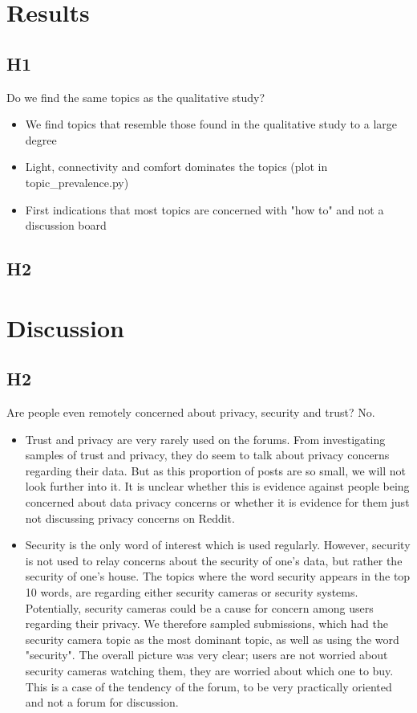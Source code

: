 \documentclass{article}
\begin{document}
    \section{Results}
    \subsection{H1}
    Do we find the same topics as the qualitative study?
    \begin{itemize}
        \item We find topics that resemble those found in the qualitative study to a large degree
        \item Light, connectivity and comfort dominates the topics (plot in topic\_prevalence.py)
        \item First indications that most topics are concerned with "how to" and not a discussion board
    \end{itemize}
    \subsection{H2}
    
    \section{Discussion}
    \subsection{H2}
    Are people even remotely concerned about privacy, security and trust?
    No.
    \begin{itemize}
        \item Trust and privacy are very rarely used on the forums. From investigating samples of trust and privacy, they do seem to talk about privacy concerns regarding their data. But as this proportion of posts are so small, we will not look further into it. It is unclear whether this is evidence against people being concerned about data privacy concerns or whether it is evidence for them just not discussing privacy concerns on Reddit.
        \item Security is the only word of interest which is used regularly. However, security is not used to relay concerns about the security of one's data, but rather the security of one's house. The topics where the word security appears in the top 10 words, are regarding either security cameras or security systems. Potentially, security cameras could be a cause for concern among users regarding their privacy. We therefore sampled submissions, which had the security camera topic as the most dominant topic, as well as using the word "security". The overall picture was very clear; users are not worried about security cameras watching them, they are worried about which one to buy. This is a case of the tendency of the forum, to be very practically oriented and not a forum for discussion.
    \end{itemize}
\end{document}
